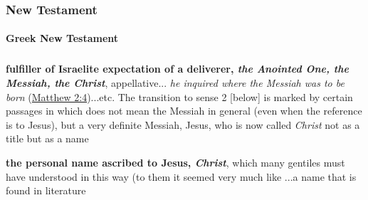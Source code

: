 		
	\subsubsection{New Testament} %
		\label{CHRIST-NT}
	
	
			
			
		\paragraph{Greek New Testament} %
			\label{CHRIST-GREEK}
		
			\subparagraph{\texorpdfstring{}{}}
				\label{CHRISTOS}
			
				\begin{compactdesc}
					\item[BDAG 971b] \textbf{}
						\begin{compactitem}
							\item[1] \textbf{fulfiller of Israelite expectation of a deliverer, \textit{the Anointed One, the Messiah, the Christ}}, appellative... \textit{he inquired where the Messiah was to be born} (\hyperref[MATTHEW-2-4]{Matthew 2:4})...etc. The transition to sense 2 [below] is marked by certain passages in which  does not mean the Messiah in general (even when the reference is to Jesus), but a very definite Messiah, Jesus, who is now called \textit{Christ} not as a title but as a name
							\item[2] \textbf{the personal name ascribed to Jesus, \textit{Christ}}, which many gentiles must have understood in this way (to them it seemed very much like ...a name that is found in literature
						\end{compactitem}
				\end{compactdesc}
				

